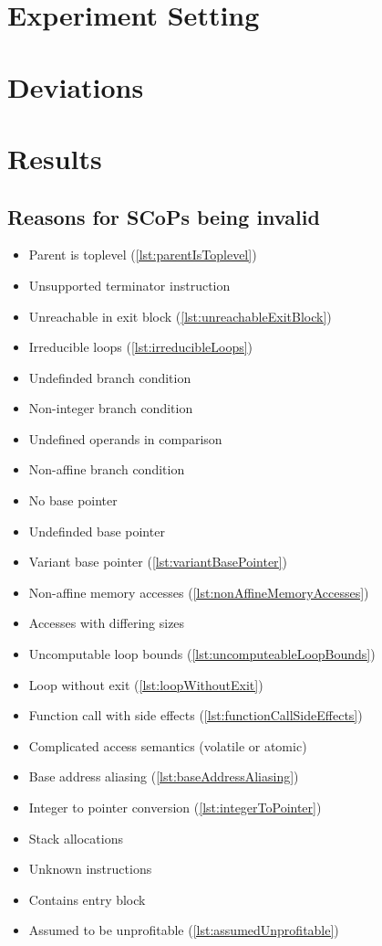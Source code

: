 \section{Experiment Setting}

\section{Deviations}

\section{Results}
\subsection{Reasons for SCoPs being invalid}
\begin{itemize}
    \item Parent is toplevel (\autoref{lst:parentIsToplevel})
    \item Unsupported terminator instruction
    \item Unreachable in exit block (\autoref{lst:unreachableExitBlock})
    \item Irreducible loops (\autoref{lst:irreducibleLoops})
    \item Undefinded branch condition
    \item Non-integer branch condition
    \item Undefined operands in comparison
    \item Non-affine branch condition
    \item No base pointer
    \item Undefinded base pointer
    \item Variant base pointer (\autoref{lst:variantBasePointer})
    \item Non-affine memory accesses (\autoref{lst:nonAffineMemoryAccesses})
    \item Accesses with differing sizes
    \item Uncomputable loop bounds (\autoref{lst:uncomputeableLoopBounds})
    \item Loop without exit (\autoref{lst:loopWithoutExit})
    \item Function call with side effects (\autoref{lst:functionCallSideEffects})
    \item Complicated access semantics (volatile or atomic)
    \item Base address aliasing (\autoref{lst:baseAddressAliasing})
    \item Integer to pointer conversion (\autoref{lst:integerToPointer})
    \item Stack allocations
    \item Unknown instructions
    \item Contains entry block
    \item Assumed to be unprofitable (\autoref{lst:assumedUnprofitable})
\end{itemize}

